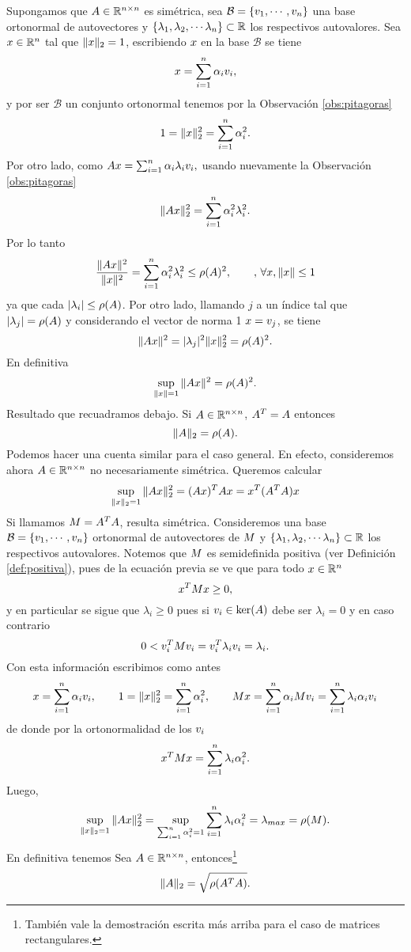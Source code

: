 \etcc
Supongamos que $\Ab\in \Rnn$ es simétrica, sea $\mathcal{B}=\{\vb_1,\cdots,\vb_n\}$ una base ortonormal de autovectores y  $\{\lambda_1, \lambda_2,\cdots \lambda_n\}\subset \mathbb R$ los respectivos autovalores.
Sea $\xb\in\R^n$ tal que $\|\xb\|_2=1$, escribiendo $\xb$ en la base $\mathcal{B}$ se tiene
$$
\xb=\sum_{i=1}^n\alpha_i\vb_i,
$$
y por ser $\mathcal{B}$ un conjunto ortonormal tenemos por la Observación \ref{obs:pitagoras}
$$
1=\|\xb\|_2^2=\sum_{i=1}^n\alpha_i^2.
$$
Por otro lado, como $\Ab\xb=\sum_{i=1}^n\alpha_i\lambda_i\vb_i,
$ usando nuevamente la  Observación \ref{obs:pitagoras}
$$
\|\Ab\xb\|_2^2=\sum_{i=1}^n\alpha_i^2\lambda_i^2.
$$
Por lo tanto
$$
\frac{\|\Ab\xb\|^2}{\|\xb\|^2}=\sum_{i=1}^n\alpha_i^2\lambda_i^2\le \rho(\Ab)^2,\qquad, \, \forall \xb, \|\xb\|\le 1
$$
ya que cada $|\lambda_i|\le \rho(\Ab)$. Por otro lado, llamando $j$ a un índice tal que $|\lambda_j|=\rho(\Ab)$ y considerando el vector de norma 1 $\xb=\vb_j$, se tiene
$$
\|\Ab\xb\|^2=|\lambda_j|^2\|\xb\|_2^2=\rho(\Ab)^2.
$$
En definitiva
$$
\sup_{\|\xb\|=1}\|\Ab\xb\|^2=\rho(\Ab)^2.
$$
Resultado que recuadramos debajo.
\tcc
Si  $\Ab\in \Rnn$, $\Ab^T=\Ab$ entonces
$$
\|\Ab\|_2=\rho(\Ab).
$$
\etcc
Podemos hacer una cuenta similar para el caso general. En efecto, consideremos ahora $\Ab\in \R^{n\times n}$ no necesariamente simétrica.
Queremos calcular
$$
\sup_{\|\xb\|_2=1}\|\Ab\xb\|_2^2=(\Ab\xb)^T\Ab\xb=\xb^T(\Ab^T\Ab)\xb
$$
Si llamamos $\Mb=\Ab^T\Ab$, resulta simétrica. Consideremos una base  $\mathcal{B}=\{\vb_1,\cdots,\vb_n\}$  ortonormal de autovectores de $\Mb$ y  $\{\lambda_1, \lambda_2,\cdots \lambda_n\}\subset \mathbb R$ los respectivos autovalores. Notemos que $\Mb$ es semidefinida positiva (ver Definición \ref{def:positiva}), pues de la ecuación previa se ve que para todo $\xb\in \Rn$
$$
\xb^T\Mb\xb\ge 0,
$$
y en particular se sigue que $\lambda_i\ge 0$ pues si $\vb_i\in \ker(\Ab)$ debe ser $\lambda_i=0$ y en caso contrario
$$
0<\vb_i^T\Mb\vb_i=\vb_i^T\lambda_i\vb_i =\lambda_i.
$$
Con esta información escribimos como antes
$$
\xb=\sum_{i=1}^n\alpha_i\vb_i,
\qquad 1=\|\xb\|_2^2=\sum_{i=1}^n\alpha_i^2, \qquad \Mb\xb=\sum_{i=1}^n\alpha_i\Mb\vb_i=\sum_{i=1}^n\lambda_i\alpha_i\vb_i
$$
de donde por la ortonormalidad de los $\vb_i$
$$
\xb^T\Mb\xb=\sum_{i=1}^n\lambda_i\alpha_i^2.
$$
Luego,
$$
\sup_{\|\xb\|_2=1}\|\Ab\xb\|_2^2=\sup_{\sum_{i=1}^n\alpha_i^2=1}\sum_{i=1}^n\lambda_i\alpha_i^2=\lambda_{max}=\rho(\Mb).
$$
En definitiva tenemos
\tcc
Sea $\Ab\in \Rnn$, entonces\footnote{También vale la demostración escrita más arriba para el caso de matrices rectangulares.}
$$
\|\Ab\|_2=\sqrt{\rho(\Ab^T\Ab)}.
$$

